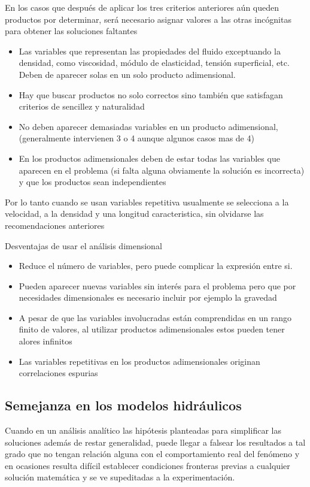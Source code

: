 En los casos que después de aplicar los tres criterios anteriores aún queden productos por determinar, será necesario asignar valores a las otras incógnitas para obtener las soluciones faltantes
\begin{itemize}
    \item Las variables que representan las propiedades del fluido exceptuando la densidad, como viscosidad, módulo de elasticidad, tensión superficial, etc. Deben de aparecer solas en un solo producto adimensional.
    \item Hay que buscar productos no solo correctos sino también que satisfagan criterios de sencillez y naturalidad
    \item No deben aparecer demasiadas variables en un producto adimensional, (generalmente intervienen 3 o 4 aunque algunos casos mas de 4) 
    \item En los productos adimensionales deben de estar todas las variables que aparecen en el problema (si falta alguna obviamente la solución es incorrecta) y que los productos sean independientes 
\end{itemize}
Por lo tanto cuando se usan variables repetitiva usualmente se selecciona a la velocidad, a la densidad y una longitud caracteristica, sin olvidarse las recomendaciones anteriores

Desventajas de usar el análisis dimensional

\begin{itemize}
    \item Reduce el número de variables, pero puede complicar la expresión entre si. 
    \item Pueden aparecer nuevas variables sin interés para el problema pero que por necesidades dimensionales es necesario incluir por ejemplo la gravedad
    \item A pesar de que las variables involucradas están comprendidas en un rango finito de valores, al utilizar productos adimensionales estos pueden tener alores infinitos
    \item Las variables repetitivas en los productos adimensionales originan correlaciones espurias
\end{itemize}
\subsection{Semejanza en los modelos hidráulicos}
Cuando en un análisis analítico las hipótesis planteadas para simplificar las soluciones además de restar generalidad, puede llegar a falsear los resultados a tal grado que no tengan relación alguna con el comportamiento real del fenómeno y en ocasiones resulta difícil establecer condiciones fronteras previas a cualquier solución matemática y se ve supeditadas a la experimentación.

